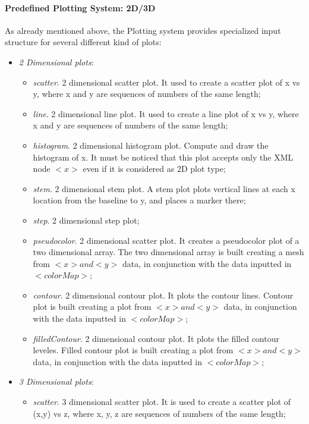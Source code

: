 \paragraph{Predefined Plotting System: 2D/3D \label{sec:23Dplotting}} 
As already mentioned above, the Plotting system provides specialized input structure for several different kind of plots:
 \begin{itemize}
     \item \textit{2 Dimensional plots}:
       \begin{itemize}
        \item \textit{scatter}. 2 dimensional scatter plot. It used to create a scatter plot of x vs y, where x and y are sequences of numbers of the same length;
        \item \textit{line}. 2 dimensional line plot. It used to create a line plot of x vs y, where x and y are sequences of numbers of the same length; 
        \item \textit{histogram}. 2 dimensional histogram plot. Compute and draw the histogram of x. It must be noticed that this plot accepts only the XML node $<x>$ even if it is considered as 2D plot type;
        \item \textit{stem}. 2 dimensional stem plot. A stem plot plots vertical lines  at each x location from the baseline to y, and places a marker there;
        \item \textit{step}. 2 dimensional step plot;
        \item \textit{pseudocolor}. 2 dimensional scatter plot. It creates a pseudocolor plot of a two dimensional array. The two dimensional array is built creating a mesh from $<x> and <y>$ data, in conjunction with the data inputted in $<colorMap>$;
         \item \textit{contour}. 2 dimensional contour plot. It plots the contour lines. Contour plot is built creating a plot from $<x> and <y>$ data, in conjunction with the data inputted in $<colorMap>$;
         \item \textit{filledContour}. 2 dimensional contour plot. It plots the filled contour leveles. Filled contour plot is built creating a plot from $<x> and <y>$ data, in conjunction with the data inputted in $<colorMap>$;
      \end{itemize}
     \item \textit{3 Dimensional plots}:
       \begin{itemize}
        \item \textit{scatter}. 3 dimensional scatter plot. It is used to create a scatter plot of (x,y) vs z, where x, y, z are sequences of numbers of the same length;

\end{itemize}
\end{itemize}
